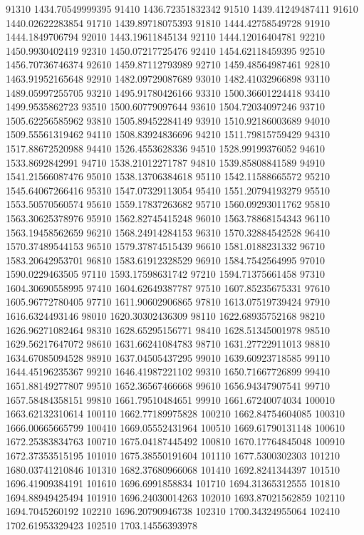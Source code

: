 {91310 1434.70549999395
91410 1436.72351832342
91510 1439.41249487411
91610 1440.02622283854
91710 1439.89718075393
91810 1444.42758549728
91910 1444.1849706794
92010 1443.19611845134
92110 1444.12016404781
92210 1450.9930402419
92310 1450.07217725476
92410 1454.62118459395
92510 1456.70736746374
92610 1459.87112793989
92710 1459.48564987461
92810 1463.91952165648
92910 1482.09729087689
93010 1482.41032966898
93110 1489.05997255705
93210 1495.91780426166
93310 1500.36601224418
93410 1499.9535862723
93510 1500.60779097644
93610 1504.72034097246
93710 1505.62256585962
93810 1505.89452284149
93910 1510.92186003689
94010 1509.55561319462
94110 1508.83924836696
94210 1511.79815759429
94310 1517.88672520988
94410 1526.4553628336
94510 1528.99199376052
94610 1533.8692842991
94710 1538.21012271787
94810 1539.85808841589
94910 1541.21566087476
95010 1538.13706384618
95110 1542.11588665572
95210 1545.64067266416
95310 1547.07329113054
95410 1551.20794193279
95510 1553.50570560574
95610 1559.17837263682
95710 1560.09293011762
95810 1563.30625378976
95910 1562.82745415248
96010 1563.78868154343
96110 1563.19458562659
96210 1568.24914284153
96310 1570.32884542528
96410 1570.37489544153
96510 1579.37874515439
96610 1581.0188231332
96710 1583.20642953701
96810 1583.61912328529
96910 1584.7542564995
97010 1590.0229463505
97110 1593.17598631742
97210 1594.71375661458
97310 1604.30690558995
97410 1604.62649387787
97510 1607.85235675331
97610 1605.96772780405
97710 1611.90602906865
97810 1613.07519739424
97910 1616.6324493146
98010 1620.30302436309
98110 1622.68935752168
98210 1626.96271082464
98310 1628.65295156771
98410 1628.51345001978
98510 1629.56217647072
98610 1631.66241084783
98710 1631.27722911013
98810 1634.67085094528
98910 1637.04505437295
99010 1639.60923718585
99110 1644.45196235367
99210 1646.41987221102
99310 1650.71667726899
99410 1651.88149277807
99510 1652.36567466668
99610 1656.94347907541
99710 1657.58484358151
99810 1661.79510484651
99910 1661.67240074034
100010 1663.62132310614
100110 1662.77189975828
100210 1662.84754604085
100310 1666.00665665799
100410 1669.05552431964
100510 1669.61790131148
100610 1672.25383834763
100710 1675.04187445492
100810 1670.17764845048
100910 1672.37353515195
101010 1675.38550191604
101110 1677.5300302303
101210 1680.03741210846
101310 1682.37680966068
101410 1692.8241344397
101510 1696.41909384191
101610 1696.6991858834
101710 1694.31365312555
101810 1694.88949425494
101910 1696.24030014263
102010 1693.87021562859
102110 1694.7045260192
102210 1696.20790946738
102310 1700.34324955064
102410 1702.61953329423
102510 1703.14556393978
}
